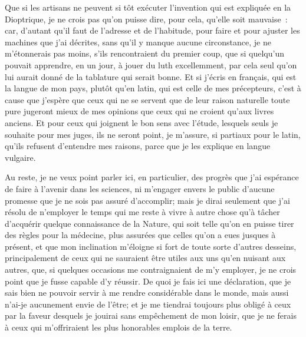 \documentclass[french,twoside]{book} %
\newif\ifdev
\renewcommand{\LettrineFontHook}{\color{rubric}}
\newcommand{\initialiv}[2]{%
  \let\oldLFH\LettrineFontHook
  \IfSubStr{Q}{#1}{
    \lettrine[lines=4, lhang=0.2, loversize=-0.1, lraise=0.2]{\smash{#1}}{#2}
  }{\IfSubStr{É}{#1}{
    \lettrine[lines=4, lhang=0.2, loversize=-0, lraise=0]{\smash{#1}}{#2}
  }{\IfSubStr{ÀÂ}{#1}{
    \lettrine[lines=4, lhang=0.2, loversize=-0, lraise=0, slope=0.6em]{\smash{#1}}{#2}
  }{\IfSubStr{A}{#1}{
    \lettrine[lines=4, lhang=0.2, loversize=0.2, slope=0.6em]{\smash{#1}}{#2}
  }{\IfSubStr{V}{#1}{
    \lettrine[lines=4, lhang=0.2, loversize=0.2, slope=-0.5em]{\smash{#1}}{#2}
  }{
    \lettrine[lines=4, lhang=0.2, loversize=0.2]{\smash{#1}}{#2}
  }}}}}
  \let\LettrineFontHook\oldLFH
}
\newcommand\chapterclose{} %
\renewcommand{\LettrineFontHook}{\bfseries\color{rubric}}
\begin{document}
Que si les artisans ne peuvent si tôt exécuter l'invention qui est expliquée en la Dioptrique, je ne crois pas qu'on puisse dire, pour cela, qu'elle soit mauvaise : car, d'autant qu'il faut de l'adresse et de l'habitude, pour faire et pour ajuster les machines que j'ai décrites, sans qu'il y manque aucune circonstance, je ne m'étonnerais pas moins, s'ils rencontraient du premier coup, que si quelqu'un pouvait apprendre, en un jour, à jouer du luth excellemment, par cela seul qu'on lui aurait donné de la tablature qui serait bonne. Et si j'écris en français, qui est la langue de mon pays, plutôt qu'en latin, qui est celle de mes précepteurs, c'est à cause que j'espère que ceux qui ne se servent que de leur raison naturelle toute pure jugeront mieux de mes opinions que ceux qui ne croient qu'aux livres anciens. Et pour ceux qui joignent le bon sens avec l'étude, lesquels seuls je souhaite pour mes juges, ils ne seront point, je m'assure, si partiaux pour le latin, qu'ils refusent d'entendre mes raisons, parce que je les explique en langue vulgaire.\par
Au reste, je ne veux point parler ici, en particulier, des progrès que j'ai espérance de faire à l'avenir dans les sciences, ni m'engager envers le public d'aucune promesse que je ne sois pas assuré d'accomplir; mais je dirai seulement que j'ai résolu de n'employer le temps qui me reste à vivre à autre chose qu'à tâcher d'acquérir quelque connaissance de la Nature, qui soit telle qu'on en puisse tirer des règles pour la médecine, plus assurées que celles qu'on a eues jusques à présent, et que mon inclination m'éloigne si fort de toute sorte d'autres desseins, principalement de ceux qui ne sauraient être utiles aux uns qu'en nuisant aux autres, que, si quelques occasions me contraignaient de m'y employer, je ne crois point que je fusse capable d'y réussir. De quoi je fais ici une déclaration, que je sais bien ne pouvoir servir à me rendre considérable dans le monde, mais aussi n'ai-je aucunement envie de l'être; et je me tiendrai toujours plus obligé à ceux par la faveur desquels je jouirai sans empêchement de mon loisir, que je ne ferais à ceux qui m'offriraient les plus honorables emplois de la terre.
\chapterclose

 


\ifbooklet
  \newpage\null\thispagestyle{empty}\newpage
\fi

\ifdev %
\fontname\font — \textsc{Les règles du jeu}\par
(\hyperref[utopie]{\underline{Lien}})\par
\noindent \initialiv{A}{lors là}\blindtext\par
\noindent \initialiv{À}{ la bonheur des dames}\blindtext\par
\noindent \initialiv{É}{tonnez-le}\blindtext\par
\noindent \initialiv{Q}{ualitativement}\blindtext\par
\noindent \initialiv{V}{aloriser}\blindtext\par
\Blindtext
\phantomsection
\label{utopie}
\Blinddocument
\fi
\end{document}
